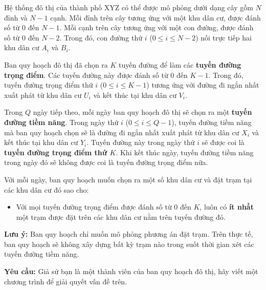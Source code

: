 Hệ thống đô thị của thành phố XYZ có thể được mô phỏng dưới dạng cây gồm $N$ đỉnh và $N-1$ cạnh. Mỗi đỉnh trên cây tương ứng với một khu dân cư, được đánh số từ $0$ đến $N-1$. Mỗi cạnh trên cây tương ứng với một con đường, được đánh số từ $0$ đến $N-2$. Trong đó, con đường thứ $i$ ($0\le i\le N-2$) nối trực tiếp hai khu dân cư $A_i$ và $B_i$.

Ban quy hoạch đô thị đã chọn ra $K$ tuyến đường để làm các \textbf{tuyến đường trọng điểm}. Các tuyến đường này được đánh số từ $0$ đến $K-1$. Trong đó, tuyến đường trọng điểm thứ $i$ ($0\le i\le K-1$) tương ứng với đường đi ngắn nhất xuất phát từ khu dân cư $U_i$ và kết thúc tại khu dân cư $V_i$.

Trong $Q$ ngày tiếp theo, mỗi ngày ban quy hoạch đô thị sẽ chọn ra một \textbf{tuyến đường tiềm năng}. Trong ngày thứ $i$ ($0\le i\le Q-1$), tuyến đường tiềm năng mà ban quy hoạch chọn sẽ là đường đi ngắn nhất xuất phát từ khu dân cư $X_i$ và kết thúc tại khu dân cư $Y_i$. Tuyến đường này trong ngày thứ $i$ sẽ được coi là \textbf{tuyến đường trọng điểm thứ $K$}. Khi kết thúc ngày, tuyến đường tiềm năng trong ngày đó sẽ không được coi là tuyến đường trọng điểm nữa.

Với mỗi ngày, ban quy hoạch muốn chọn ra một số khu dân cư và đặt trạm tại các khu dân cư đó sao cho:
\begin{itemize}
   \item Với mọi tuyến đường trọng điểm được đánh số từ $0$ đến $K$, luôn có \textbf{ít nhất} một trạm được đặt trên các khu dân cư nằm trên tuyến đường đó.
\end{itemize}

\textbf{Lưu ý:} Ban quy hoạch chỉ muốn mô phỏng phương án đặt trạm. Trên thực tế, ban quy hoạch sẽ không xây dựng bất kỳ trạm nào trong suốt thời gian xét các tuyến đường tiềm năng.

\textbf{Yêu cầu:} Giả sử bạn là một thành viên của ban quy hoạch đô thị, hãy viết một chương trình để giải quyết vấn đề trên.